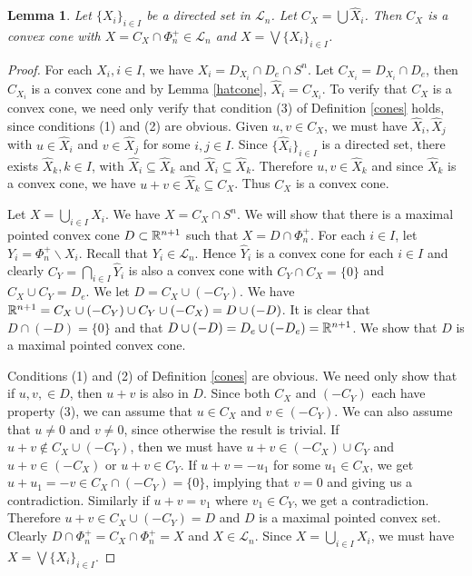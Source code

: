 \documentclass[psamsfonts]{amsart}
\numberwithin{equation}{subsection}
\theoremstyle{plain}
\newtheorem{lemma}[theorem]{Lemma}
\theoremstyle{definition}
\theoremstyle{remark}
\begin{document}
\begin{lemma} Let $\{X_i\}_{i \in I}$ be a directed set in $\mathcal{L}_{n}$. Let $C_X = \bigcup \widehat{X}_i$. Then 
$C_X$ is a convex cone with  $X = C_X \cap \Phi_n^+ \in \mathcal{L}_{n}$ and   $X = \bigvee \{X_i\}_{i \in I}$. 
\end{lemma}
\begin{proof} For each $X_i, i \in I$, we have $X_i = D_{X_i} \cap D_e \cap S^n$. Let $C_{X_i} = D_{X_i} \cap D_e $, then 
$C_{X_i}$ is a convex cone and by Lemma \ref{hatcone}, $\widehat{X}_i = C_{X_i}$. 
To verify  that $C_X$ is a convex cone, we need only verify that condition (3) of Definition \ref{cones} holds, since  conditions (1) and (2)  are obvious. 
 Given $u, v \in C_X$, we must  have 
$\widehat{X}_i, \widehat{X}_j$ with $u \in \widehat{X}_i$ and $v \in \widehat{X}_j$ for some $i, j \in I$. Since $\{\widehat{X}_i\}_{i \in I}$ is  a directed set, there exists
$\widehat{X}_k, k \in I$, with $\widehat{X}_i \subseteq \widehat{X}_k$ and  $\widehat{X}_i \subseteq \widehat{X}_k$. Therefore  $u, v \in \widehat{X}_k$ and since $ \widehat{X}_k$ is a convex cone,  we have $u + v \in \widehat{X}_k \subseteq C_X$. Thus $C_X$ is a 
convex cone.  

Let $X = \bigcup_{i\in I} X_i$. We have $X  = C_X \cap S^n$. 
We will  show that there is a maximal pointed convex cone $D \subset \Bbb{R}^{n + 1}$ such that $X  = D \cap \Phi^+_{n }$. 
For each $i \in I$, let $Y_i = \Phi^+_{n} \backslash X_i$. Recall that $Y_i \in \mathcal{L}_{n }$. Hence $\widehat{Y}_i$ is a convex cone for each $i \in I$ and clearly 
$C_Y = \bigcap_{i \in I} \hat{Y}_i$ is also a convex cone with $C_Y\cap C_X = \{0\}$ and $C_X \cup C_Y = D_e$. We let $D = C_X \cup (-C_Y)$. We have $\Bbb{R}^{n + 1} = C_X \cup (-C_Y) \cup C_Y \cup (-C_X)  = D \cup (-D)$. It is clear that $D \cap (-D) = \{0\}$ and that 
$D\cup (-D) = D_e \cup (- D_e) = \Bbb{R}^{n + 1}$. We show that $D$ is a maximal pointed convex cone. 

Conditions (1) and (2) 
of Definition  \ref{cones} are obvious. 
 We need only show that if $u, v, \in D$, then $u + v$ is also in $D$. Since both $C_X$ and $(-C_Y)$ each have property (3), we can assume that $u \in C_X$ and $v \in (-C_Y)$. We can also assume that $u \not= 0$ and $v \not=0$, since otherwise the result is trivial. If $u + v \not\in C_X \cup (-C_Y)$, then we must have $u + v \in (-C_X) \cup C_Y$ and 
 $u + v \in (-C_X)$ or $u + v \in   C_Y$. If $u + v = -u_1$ for some $u_1 \in C_X$, we get $u + u_1 = -v \in C_X \cap (-C_Y) = \{0\}$, implying that $v = 0$ and  giving us a contradiction. Similarly if $u + v = v_1$ where $v_1 \in C_Y$, we get a contradiction. Therefore 
 $u + v  \in C_X \cup (-C_Y) = D$ and $D$ is a maximal pointed convex set. 
 Clearly $D\cap \Phi_n^+ =  C_X \cap \Phi_n^+ = X$ and $X \in \mathcal{L}_n$.  
  Since $X = \bigcup_{i \in I}X_i$, we must have $X  = \bigvee \{X_i\}_{i \in I}$. 
\end{proof}
\end{document}
